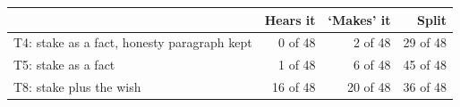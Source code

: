 \begin{tabular}{@{}lrrr@{}}
\toprule
 & Hears it & `Makes' it & Split \\
\midrule
T4: stake as a fact, honesty paragraph kept & 0 of 48 & 2 of 48 & 29 of 48 \\
T5: stake as a fact & 1 of 48 & 6 of 48 & 45 of 48 \\
T8: stake plus the wish & 16 of 48 & 20 of 48 & 36 of 48 \\
\bottomrule
\end{tabular}

